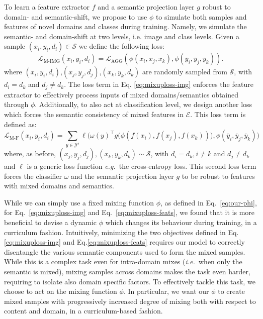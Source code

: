 \documentclass[runningheads]{llncs}
\newcommand{\eg}{\emph{e.g.~}}
\newcommand{\ie}{\emph{i.e.~}}
\begin{document}
To learn a feature extractor $f$ and a semantic projection layer $g$ robust to domain- and semantic-shift, we propose to use  $\phi$ to simulate both samples and features of novel domains and classes during training. Namely, we simulate the semantic- and domain-shift at two levels, i.e. image and class levels. 
 Given a sample $(x_i,y_i,d_i)\in\mathcal{S}$ we define the following loss:
\begin{equation}
    \label{eq:mixuploss-img}
    \mathcal{L}_{\text{M-IMG}}(x_i,y_i,d_i) = \mathcal{L}_{\text{AGG}}(\phi(x_i,x_j,x_k),\phi(\bar{y}_i,\bar{y}_j,\bar{y}_k)).
\end{equation}
where $(x_i,y_i,d_i)$,$(x_j,y_j,d_j)$,$(x_k,y_k,d_k)$ are randomly sampled from $\mathcal{S}$, with $d_i=d_k$ and $d_j\neq d_k$. 
The loss term in Eq. \eqref{eq:mixuploss-img} enforces the feature extractor to effectively process inputs of mixed domains/semantics obtained through $\phi$. Additionally, to also act at classification level, we design another loss which forces the semantic consistency of mixed features in $\mathcal{E}$. This loss term is defined as: 
\begin{equation}
    \label{eq:mixuploss-feats}
    \mathcal{L}_{\text{M-F}}(x_i,y_i,d_i) =  \sum_{y\in\mathcal{Y}^s} \ell\biggl(\omega(y)^\intercal g\bigl(\phi(f(x_i),f(x_j),f(x_k))\bigr),\phi(\bar{y}_i,\bar{y}_j,\bar{y}_k)\biggr)
\end{equation} 
where, as before, $(x_j,y_j,d_j),(x_k,y_k,d_k)\sim \mathcal{S}$, with $d_i=d_k,i\neq k$ and $d_j\neq d_k$ and $\ell$ is a generic loss function \eg the cross-entropy loss. 
This second loss term forces the classifier $\omega$ and the semantic projection layer $g$ to be robust to features with mixed domains and semantics. 

While we can simply use a fixed mixing function $\phi$, as defined in Eq.~\eqref{eq:our-phi}, for Eq.~\eqref{eq:mixuploss-img} and Eq.~\eqref{eq:mixuploss-feats}, we found that it is more beneficial to devise a dynamic $\phi$ which changes its behaviour during training, in a curriculum fashion. Intuitively, minimizing the two objectives defined in Eq.\eqref{eq:mixuploss-img} and Eq.\eqref{eq:mixuploss-feats} {requires our model to correctly disentangle the various semantic components used to form the mixed samples.} While this is a complex task even for intra-domain mixes (\ie when only the semantic is mixed), mixing samples across domains makes the task even harder, requiring to isolate also domain specific factors. 
To effectively tackle this task, we choose to act on the mixing function $\phi$. {In particular, we want our $\phi$ to create mixed samples with progressively increased degree of mixing both with respect to content and domain, in a curriculum-based fashion}. 
\end{document}
